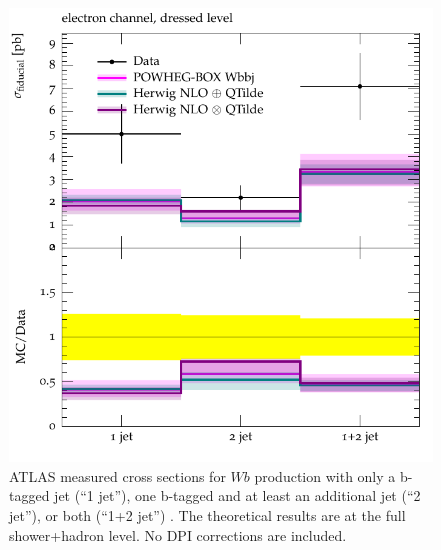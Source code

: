 \documentclass[11pt]{cernrep}
\begin{document}
\begin{figure}[htbp]
\begin{center}
   \includegraphics[scale=0.65]{figs/wbb/compared/d01-x01-y01.pdf}
\end{center}
\caption{ATLAS measured cross sections for $Wb$ production with only a b-tagged jet (``1
  jet''), one b-tagged and at least an additional jet (``2 jet''), or both (``1+2 jet'') .
  The theoretical results are at the full shower+hadron level. No DPI
  corrections are included. } 
\label{fig:wbb-njet}
\end{figure}
\end{document}
